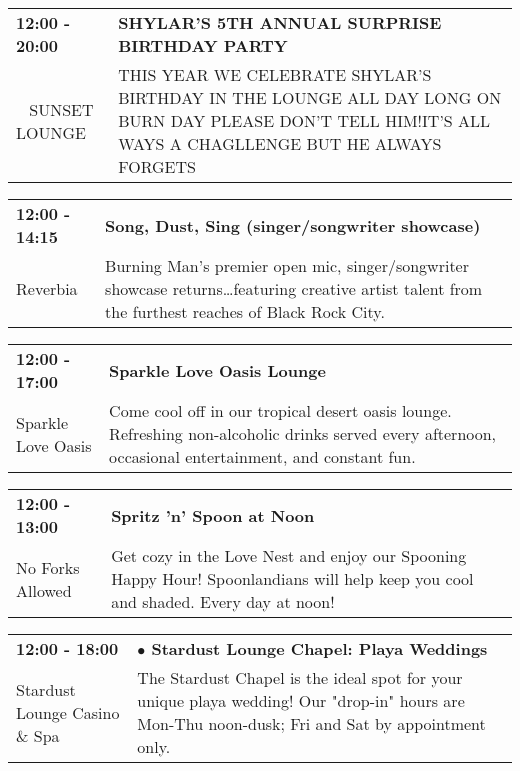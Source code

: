 \begin{tabular}{ p{1in} p{2.2in} }
    \textbf{12:00 - 20:00} & \textbf{SHYLAR'S 5TH ANNUAL SURPRISE BIRTHDAY PARTY} \\
    ~ \newline SUNSET LOUNGE & THIS YEAR WE CELEBRATE SHYLAR'S BIRTHDAY IN THE LOUNGE ALL DAY LONG ON BURN DAY PLEASE DON'T TELL HIM!IT'S ALL WAYS A CHAGLLENGE BUT HE ALWAYS FORGETS \\
    \hline 
\end{tabular}
    
\begin{tabular}{ p{1in} p{2.2in} }
    \textbf{12:00 - 14:15} & \textbf{Song, Dust, Sing (singer/songwriter showcase)} \\
    Reverbia \newline  & Burning Man's premier open mic, singer/songwriter showcase returns\ldots featuring creative artist talent from the furthest reaches of Black Rock City. \\
    \hline 
\end{tabular}
    
\begin{tabular}{ p{1in} p{2.2in} }
    \textbf{12:00 - 17:00} & \textbf{Sparkle Love Oasis Lounge} \\
    Sparkle Love Oasis \newline  & Come cool off in our tropical desert oasis lounge. Refreshing non-alcoholic drinks served every afternoon, occasional entertainment, and constant fun. \\
    \hline 
\end{tabular}
    
\begin{tabular}{ p{1in} p{2.2in} }
    \textbf{12:00 - 13:00} & \textbf{Spritz 'n' Spoon at Noon} \\
    No Forks Allowed \newline  & Get cozy in the Love Nest and enjoy our Spooning Happy Hour! Spoonlandians will help keep you cool and shaded. Every day at noon! \\
    \hline 
\end{tabular}
    
\begin{tabular}{ p{1in} p{2.2in} }
    \textbf{12:00 - 18:00} & \textbf{$\bullet$	Stardust Lounge Chapel: Playa Weddings} \\
    Stardust Lounge Casino \& Spa \newline  & The Stardust Chapel is the ideal spot for your unique playa wedding! Our "drop-in" hours are Mon-Thu noon-dusk; Fri and Sat by appointment only. \\
    \hline 
\end{tabular}
    
